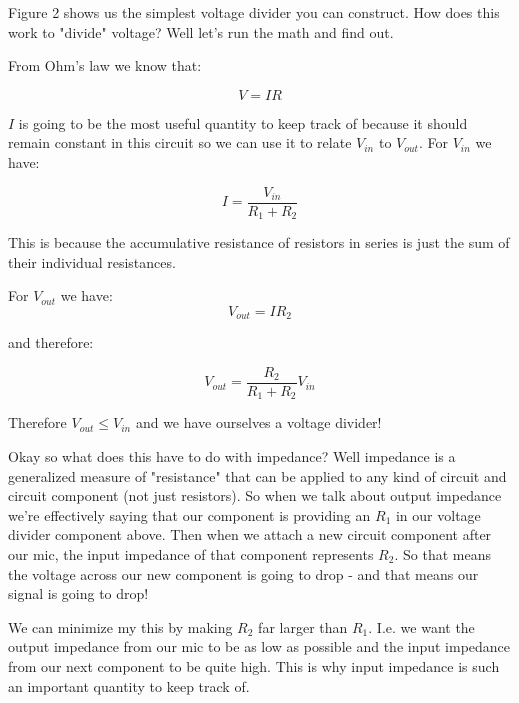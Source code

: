 \documentclass[12pt,a6paper]{book}
\begin{document}
Figure 2 shows us the simplest voltage divider you can construct. How does this work to "divide" voltage? Well let's run the math and find out. 

From Ohm's law we know that:

\begin{equation}
V = IR
\end{equation}

$I$ is going to be the most useful quantity to keep track of because it should remain constant in this circuit so we can use it to relate $V_{in}$ to $V_{out}$. For $V_{in}$ we have:

\begin{equation}
I = \frac{V_{in}}{R_1 + R_2}
\end{equation}

This is because the accumulative resistance of resistors in series is just the sum of their individual resistances. 

For $V_{out}$ we have:
\begin{equation}
V_{out} = IR_2
\end{equation}

and therefore:

\begin{equation}
V_{out}=\frac{R_2}{R_1 + R_2}V_{in}
\end{equation}

Therefore $V_{out} \leq V_{in}$ and we have ourselves a voltage divider! 

Okay so what does this have to do with impedance? Well impedance is a generalized measure of "resistance" that can be applied to any kind of circuit and circuit component (not just resistors). So when we talk about output impedance we're effectively saying that our component is providing an $R_1$ in our voltage divider component above. Then when we attach a new circuit component after our mic, the input impedance of that component represents $R_2$. So that means the voltage across our new component is going to drop - and that means our signal is going to drop! 

We can minimize my this by making $R_2$ far larger than $R_1$. I.e. we want the output impedance from our mic to be as low as possible and the input impedance from our next component to be quite high. This is why input impedance is such an important quantity to keep track of. 
\end{document}
